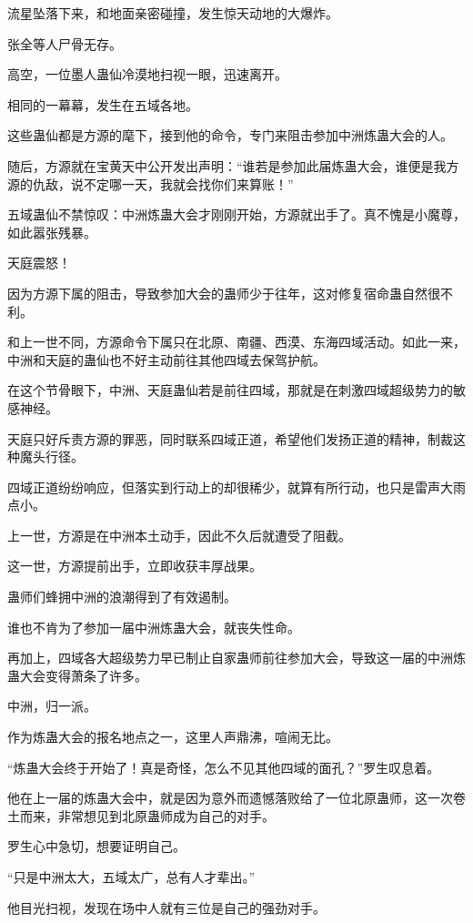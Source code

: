 \begin{this_body}
流星坠落下来，和地面亲密碰撞，发生惊天动地的大爆炸。

张全等人尸骨无存。

高空，一位墨人蛊仙冷漠地扫视一眼，迅速离开。

相同的一幕幕，发生在五域各地。

这些蛊仙都是方源的麾下，接到他的命令，专门来阻击参加中洲炼蛊大会的人。

随后，方源就在宝黄天中公开发出声明：“谁若是参加此届炼蛊大会，谁便是我方源的仇敌，说不定哪一天，我就会找你们来算账！”

五域蛊仙不禁惊叹：中洲炼蛊大会才刚刚开始，方源就出手了。真不愧是小魔尊，如此嚣张残暴。

天庭震怒！

因为方源下属的阻击，导致参加大会的蛊师少于往年，这对修复宿命蛊自然很不利。

和上一世不同，方源命令下属只在北原、南疆、西漠、东海四域活动。如此一来，中洲和天庭的蛊仙也不好主动前往其他四域去保驾护航。

在这个节骨眼下，中洲、天庭蛊仙若是前往四域，那就是在刺激四域超级势力的敏感神经。

天庭只好斥责方源的罪恶，同时联系四域正道，希望他们发扬正道的精神，制裁这种魔头行径。

四域正道纷纷响应，但落实到行动上的却很稀少，就算有所行动，也只是雷声大雨点小。

上一世，方源是在中洲本土动手，因此不久后就遭受了阻截。

这一世，方源提前出手，立即收获丰厚战果。

蛊师们蜂拥中洲的浪潮得到了有效遏制。

谁也不肯为了参加一届中洲炼蛊大会，就丧失性命。

再加上，四域各大超级势力早已制止自家蛊师前往参加大会，导致这一届的中洲炼蛊大会变得萧条了许多。

中洲，归一派。

作为炼蛊大会的报名地点之一，这里人声鼎沸，喧闹无比。

“炼蛊大会终于开始了！真是奇怪，怎么不见其他四域的面孔？”罗生叹息着。

他在上一届的炼蛊大会中，就是因为意外而遗憾落败给了一位北原蛊师，这一次卷土而来，非常想见到北原蛊师成为自己的对手。

罗生心中急切，想要证明自己。

“只是中洲太大，五域太广，总有人才辈出。”

他目光扫视，发现在场中人就有三位是自己的强劲对手。


\end{this_body}
